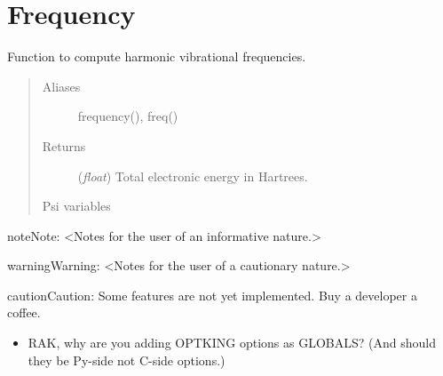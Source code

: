 \documentclass[letterpaper,10pt,english]{sphinxmanual}
\begin{document}
\chapter{Frequency}
\label{index:frequency}

\begin{fulllineitems}
\label{index:driver.frequency}
Function to compute harmonic vibrational frequencies.
\begin{quote}\begin{description}
\item[{Aliases }] \leavevmode
frequency(), freq()

\item[{Returns}] \leavevmode
(\emph{float}) Total electronic energy in Hartrees.

\item[{Psi variables}] \leavevmode
\end{description}\end{quote}

\begin{fulllineitems}
\label{index:envvar-_PSIVARIABLESETBYFUNCTION_}\label{index:envvar-_ANOTHERPSIVARIABLEWITHnonstandardPORTIONOFNAME_}
\end{fulllineitems}


\begin{notice}{note}{Note:}
\textless{}Notes for the user
of an informative nature.\textgreater{}
\end{notice}

\begin{notice}{warning}{Warning:}
\textless{}Notes for the user
of a cautionary nature.\textgreater{}
\end{notice}

\begin{notice}{caution}{Caution:}
Some features are not yet implemented. Buy a developer a coffee.
\begin{itemize}
\item {} 
RAK, why are you adding OPTKING options as GLOBALS? (And should they be Py-side not C-side options.)


\end{itemize}
\end{notice}
\end{fulllineitems}
\end{document}
